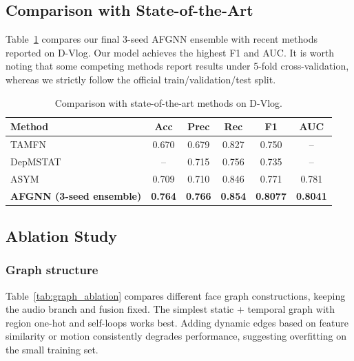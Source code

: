 \documentclass[conference]{IEEEtran}
\begin{document}
\subsection{Comparison with State-of-the-Art}

Table~\ref{tab:sota} compares our final 3-seed AFGNN ensemble with recent methods reported on D-Vlog.
Our model achieves the highest F1 and AUC.
It is worth noting that some competing methods report results under 5-fold cross-validation, whereas we strictly follow the official train/validation/test split.

\begin{table}[t]
\centering
\caption{Comparison with state-of-the-art methods on D-Vlog.}
\label{tab:sota}
\small
\begin{tabular}{lccccc}
\toprule
Method & Acc & Prec & Rec & F1 & AUC \\
\midrule
TAMFN~\cite{zhou2023tamfn} & 0.670 & 0.679 & 0.827 & 0.750 & -- \\
DepMSTAT~\cite{tao2024depmstat} & -- & 0.715 & 0.756 & 0.735 & -- \\
ASYM~\cite{hua2026asym} & 0.709 & 0.710 & 0.846 & 0.771 & 0.781 \\
\midrule
\textbf{AFGNN (3-seed ensemble)} & \textbf{0.764} & \textbf{0.766} & \textbf{0.854} & \textbf{0.8077} & \textbf{0.8041} \\
\bottomrule
\end{tabular}
\end{table}

\subsection{Ablation Study}

\subsubsection{Graph structure}

Table~\ref{tab:graph_ablation} compares different face graph constructions, keeping the audio branch and fusion fixed.
The simplest static + temporal graph with region one-hot and self-loops works best.
Adding dynamic edges based on feature similarity or motion consistently degrades performance, suggesting overfitting on the small training set.
\end{document}

